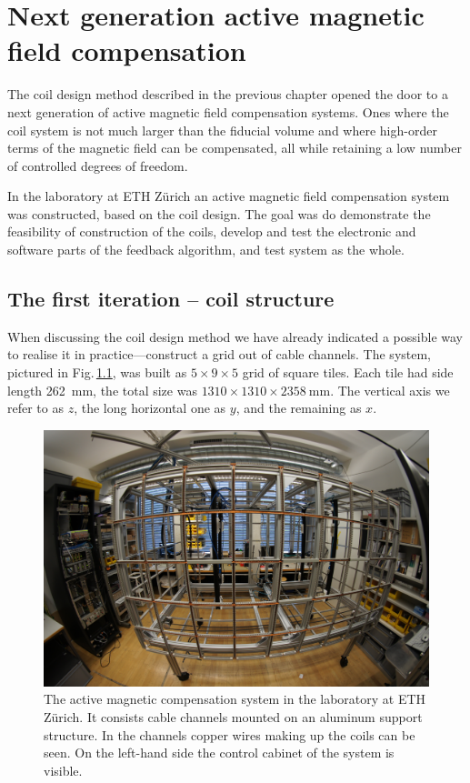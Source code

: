 \chapter{Next generation active magnetic field compensation}
\label{ch:sfc-prototype}

The coil design method described in the previous chapter opened the door to a next generation of active magnetic field compensation systems. Ones where the coil system is not much larger than the fiducial volume and where high-order terms of the magnetic field can be compensated, all while retaining a low number of controlled degrees of freedom.


In the laboratory at ETH Zürich an active magnetic field compensation system was constructed, based on the coil design. The goal was do demonstrate the feasibility of construction of the coils, develop and test the electronic and software parts of the feedback algorithm, and test system as the whole.



\section{The first iteration -- coil structure}
When discussing the coil design method we have already indicated a possible way to realise it in practice---construct a grid out of cable channels. The system, pictured in Fig.\,\ref{fig:prototype_photo}, was built as $5 \times 9 \times 5$ grid of square tiles. Each tile had side length \SI{262}{\milli\meter}, the total size was $1310 \times 1310 \times \SI{2358}{\milli\meter}$. The vertical axis we refer to as $z$, the long horizontal one as $y$, and the remaining as $x$.

\begin{figure}
  \centering
  \includegraphics[width=0.9\linewidth]{gfx/prototype/DSC03472.JPG}
  \caption{The active magnetic compensation system in the laboratory at ETH Zürich. It consists cable channels mounted on an aluminum support structure. In the channels copper wires making up the coils can be seen. On the left-hand side the control cabinet of the system is visible.}
  \label{fig:prototype_photo}
\end{figure}

